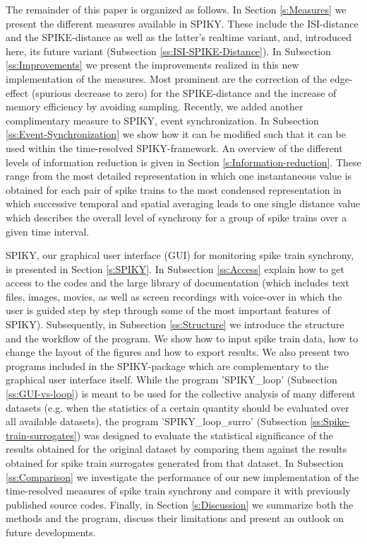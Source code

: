 \documentclass[10pt,twocolumn]{elsart5p}
\begin{document}
The remainder of this paper is organized as follows. In Section \ref{s:Measures} we present the different measures available in SPIKY. These include the ISI-distance and the SPIKE-distance as well as the latter's realtime variant, and, introduced here, its future variant (Subsection \ref{ss:ISI-SPIKE-Distance}). In Subsection \ref{ss:Improvements} we present the improvements realized in this new implementation of the measures. Most prominent are the correction of the edge-effect (spurious decrease to zero) for the SPIKE-distance and the increase of memory efficiency by avoiding sampling. Recently, we added another complimentary measure to SPIKY, event synchronization. In Subsection \ref{ss:Event-Synchronization} we show how it can be modified such that it can be used within the time-resolved SPIKY-framework. An overview of the different levels of information reduction is given in Section \ref{s:Information-reduction}. These range from the most detailed representation in which one instantaneous value is obtained for each pair of spike trains to the most condensed representation in which successive temporal and spatial averaging leads to one single distance value which describes the overall level of synchrony for a group of spike trains over a given time interval.

SPIKY, our graphical user interface (GUI) for monitoring spike train synchrony, is presented in Section \ref{s:SPIKY}. In Subsection \ref{ss:Access} explain how to get access to the codes and the large library of documentation (which includes text files, images, movies, as well as screen recordings with voice-over in which the user is guided step by step through some of the most important features of SPIKY). Subsequently, in Subsection \ref{ss:Structure} we introduce the structure and the workflow of the program. We show how to input spike train data, how to change the layout of the figures and how to export results. We also present two programs included in the SPIKY-package which are complementary to the graphical user interface itself. While the program 'SPIKY\_loop' (Subsection \ref{ss:GUI-vs-loop}) is meant to be used for the collective analysis of many different datasets (e.g. when the statistics of a certain quantity should be evaluated over all available datasets), the program 'SPIKY\_loop\_surro' (Subsection \ref{ss:Spike-train-surrogates}) was designed to evaluate the statistical significance of the results obtained for the original dataset by comparing them against the results obtained for spike train surrogates generated from that dataset. In Subsection \ref{ss:Comparison} we investigate the performance of our new implementation of the time-resolved measures of spike train synchrony and compare it with previously published source codes. Finally, in Section \ref{s:Discussion} we summarize both the methods and the program, discuss their limitations and present an outlook on future developments.
 
\end{document}
